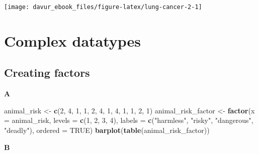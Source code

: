 \documentclass[]{book}
\newenvironment{Shaded}{\begin{snugshade}}{\end{snugshade}}
\newcommand{\DataTypeTok}[1]{\textcolor[rgb]{0.13,0.29,0.53}{#1}}
\newcommand{\DecValTok}[1]{\textcolor[rgb]{0.00,0.00,0.81}{#1}}
\newcommand{\KeywordTok}[1]{\textcolor[rgb]{0.13,0.29,0.53}{\textbf{#1}}}
\newcommand{\NormalTok}[1]{#1}
\newcommand{\OtherTok}[1]{\textcolor[rgb]{0.56,0.35,0.01}{#1}}
\newcommand{\StringTok}[1]{\textcolor[rgb]{0.31,0.60,0.02}{#1}}
\begin{document}
\begin{center}\texttt{[image: davur\_ebook\_files/figure-latex/lung-cancer-2-1]} \end{center}

\hypertarget{complex-datatypes-2}{%
\section{Complex datatypes}\label{complex-datatypes-2}}

\hypertarget{creating-factors-1}{%
\subsection{Creating factors}\label{creating-factors-1}}

\textbf{A}

\begin{Shaded}
\begin{Highlighting}[]
\NormalTok{animal_risk <-}\StringTok{ }\KeywordTok{c}\NormalTok{(}\DecValTok{2}\NormalTok{, }\DecValTok{4}\NormalTok{, }\DecValTok{1}\NormalTok{, }\DecValTok{1}\NormalTok{, }\DecValTok{2}\NormalTok{, }\DecValTok{4}\NormalTok{, }\DecValTok{1}\NormalTok{, }\DecValTok{4}\NormalTok{, }\DecValTok{1}\NormalTok{, }\DecValTok{1}\NormalTok{, }\DecValTok{2}\NormalTok{, }\DecValTok{1}\NormalTok{)}
\NormalTok{animal_risk_factor <-}\StringTok{ }\KeywordTok{factor}\NormalTok{(}\DataTypeTok{x =}\NormalTok{ animal_risk,}
                             \DataTypeTok{levels =} \KeywordTok{c}\NormalTok{(}\DecValTok{1}\NormalTok{, }\DecValTok{2}\NormalTok{, }\DecValTok{3}\NormalTok{, }\DecValTok{4}\NormalTok{),}
                             \DataTypeTok{labels =} \KeywordTok{c}\NormalTok{(}\StringTok{"harmless"}\NormalTok{, }\StringTok{"risky"}\NormalTok{, }\StringTok{"dangerous"}\NormalTok{, }\StringTok{"deadly"}\NormalTok{),}
                             \DataTypeTok{ordered =} \OtherTok{TRUE}\NormalTok{)}
\KeywordTok{barplot}\NormalTok{(}\KeywordTok{table}\NormalTok{(animal_risk_factor))}
\end{Highlighting}
\end{Shaded}

\textbf{B}
\end{document}
